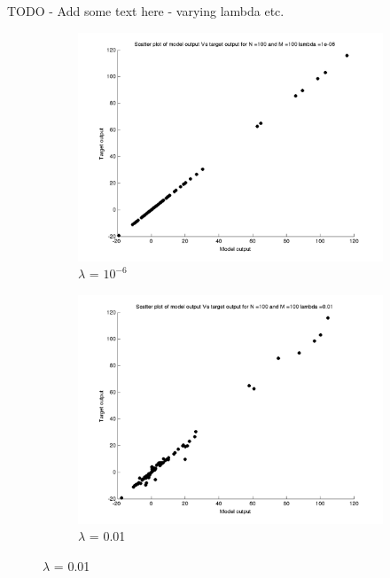 \documentclass{article}
\begin{document}
TODO - Add some text here - varying lambda etc.

\begin{figure}[H]

\begin{subfigure}{.5\textwidth}
\centering
\includegraphics[width=\linewidth]{D2/Scatter/Varyinglambda_N100M100lambda1e-06}
\caption{$\lambda$ = $10^{-6}$}
\end{subfigure}
\begin{subfigure}{.5\textwidth}
\includegraphics[width=\linewidth]{D2/Scatter/Varyinglambda_N100M100lambda0_01}
\caption{$\lambda$ = 0.01}
\end{subfigure}



\end{figure}
\end{document}
